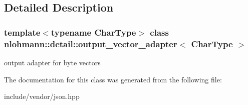 \subsection{Detailed Description}
\subsubsection*{template$<$typename Char\+Type$>$\newline
class nlohmann\+::detail\+::output\+\_\+vector\+\_\+adapter$<$ Char\+Type $>$}

output adapter for byte vectors 

The documentation for this class was generated from the following file\+:\begin{DoxyCompactItemize}
\item 
include/vendor/json.\+hpp\end{DoxyCompactItemize}
